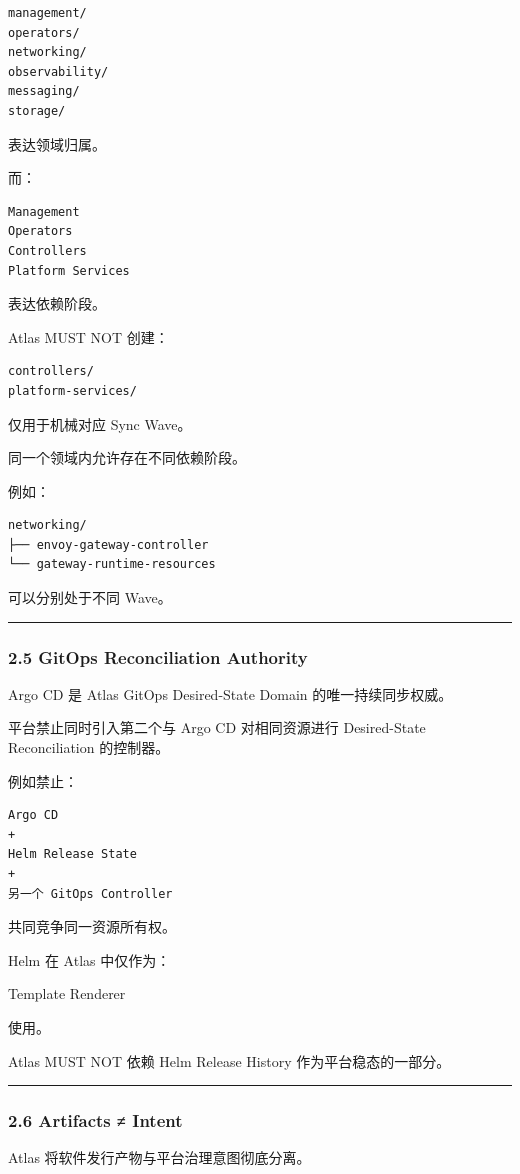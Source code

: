 \documentclass[11pt,a4paper]{article}
\begin{document}
\begin{lstlisting}[language=text]
management/
operators/
networking/
observability/
messaging/
storage/
\end{lstlisting}
表达领域归属。

而：

\begin{lstlisting}[language=text]
Management
Operators
Controllers
Platform Services
\end{lstlisting}
表达依赖阶段。

Atlas MUST NOT 创建：

\begin{lstlisting}[language=text]
controllers/
platform-services/
\end{lstlisting}
仅用于机械对应 Sync Wave。

同一个领域内允许存在不同依赖阶段。

例如：

\begin{lstlisting}[language=text]
networking/
├── envoy-gateway-controller
└── gateway-runtime-resources
\end{lstlisting}
可以分别处于不同 Wave。

\vspace{0.5em}\hrule\vspace{0.5em}
\subsubsection{2.5 GitOps Reconciliation Authority}
Argo CD 是 Atlas GitOps Desired-State Domain 的唯一持续同步权威。

平台禁止同时引入第二个与 Argo CD 对相同资源进行 Desired-State Reconciliation 的控制器。

例如禁止：

\begin{lstlisting}[language=text]
Argo CD
+
Helm Release State
+
另一个 GitOps Controller
\end{lstlisting}
共同竞争同一资源所有权。

Helm 在 Atlas 中仅作为：

\begin{gfmBlockquote}
Template Renderer
\end{gfmBlockquote}
使用。

Atlas MUST NOT 依赖 Helm Release History 作为平台稳态的一部分。

\vspace{0.5em}\hrule\vspace{0.5em}
\subsubsection{2.6 Artifacts ≠ Intent}
Atlas 将软件发行产物与平台治理意图彻底分离。
\end{document}
